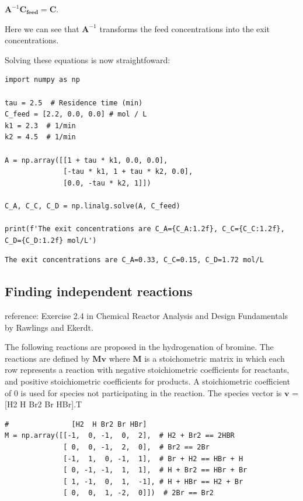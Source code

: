 \documentclass[11pt]{article}
\begin{document}
\(\mathbf{A}^{-1} \mathbf{C_{feed}} = \mathbf{C}\).

Here we can see that \(\mathbf{A}^{-1}\) transforms the feed concentrations into the exit concentrations.

Solving these equations is now straightfoward:

\begin{verbatim}
import numpy as np

tau = 2.5  # Residence time (min)
C_feed = [2.2, 0.0, 0.0] # mol / L
k1 = 2.3  # 1/min
k2 = 4.5  # 1/min

A = np.array([[1 + tau * k1, 0.0, 0.0],
              [-tau * k1, 1 + tau * k2, 0.0],
              [0.0, -tau * k2, 1]])

C_A, C_C, C_D = np.linalg.solve(A, C_feed)

print(f'The exit concentrations are C_A={C_A:1.2f}, C_C={C_C:1.2f}, C_D={C_D:1.2f} mol/L')
\end{verbatim}

\begin{verbatim}
The exit concentrations are C_A=0.33, C_C=0.15, C_D=1.72 mol/L

\end{verbatim}

\subsection{Finding independent reactions}
\label{sec:org7020cd4}

reference: Exercise 2.4 in Chemical Reactor Analysis and Design Fundamentals by Rawlings and Ekerdt.

The following reactions are proposed in the hydrogenation of bromine. The reactions are defined by \(\mathbf{M} \mathbf{v}\)  where \(\mathbf{M}\) is a stoichometric matrix in which each row represents a reaction with negative stoichiometric coefficients for reactants, and positive stoichiometric coefficients for products. A stoichiometric coefficient of 0 is used for species not participating in the reaction.  The species vector is \(\mathbf{v}\) = [H2 H Br2 Br HBr].T

\begin{verbatim}
#               [H2  H Br2 Br HBr]
M = np.array([[-1,  0, -1,  0,  2],  # H2 + Br2 == 2HBR
              [ 0,  0, -1,  2,  0],  # Br2 == 2Br
              [-1,  1,  0, -1,  1],  # Br + H2 == HBr + H
              [ 0, -1, -1,  1,  1],  # H + Br2 == HBr + Br
              [ 1, -1,  0,  1,  -1], # H + HBr == H2 + Br
              [ 0,  0,  1, -2,  0]])  # 2Br == Br2
\end{verbatim}
\end{document}
